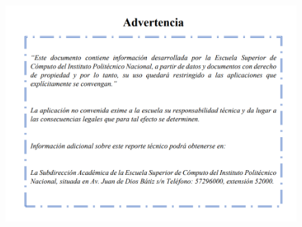 \begin{titlepage}
\begin{titlepage}
\end{titlepage}
	\begin{figure}[H]
		\centering
		\includegraphics[width=17cm,height=13cm]{imagenes/adv.png}
	\end{figure}
\end{titlepage}